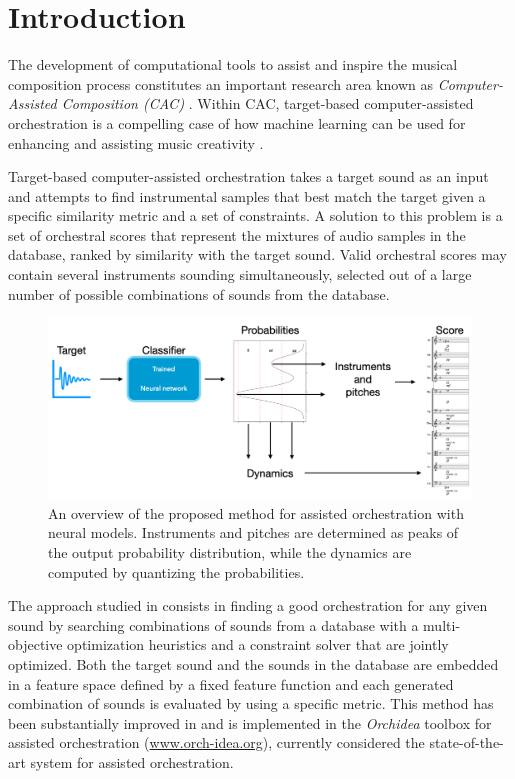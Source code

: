 \documentclass[runningheads,a4paper]{llncs}
\begin{document}
%
\section{Introduction}\label{sec:introduction}

The development of computational tools to assist and inspire the musical composition process constitutes an important research area known as \emph{Computer-Assisted Composition (CAC)} \cite{FerVic2013, Ari2005}. Within CAC, target-based computer-assisted orchestration is a compelling case of how machine learning can be used for {enhancing} and {assisting} music creativity \cite{Maresz2003}. 

Target-based computer-assisted orchestration takes a target sound as an input and attempts to find instrumental samples that best match the target given a specific similarity metric and a set of constraints. A solution to this problem is a set of orchestral scores that represent the mixtures of audio samples in the database, ranked by similarity with the target sound. Valid orchestral scores may contain several instruments sounding simultaneously, selected out of a large number of possible combinations of sounds from the database.

\begin{figure}
	\centering
	\includegraphics[scale=0.20]{../ISMIR_2020/figs/method.png}
	\caption{An overview of the proposed method for assisted orchestration with neural models. Instruments and pitches are determined as peaks of the output probability distribution, while the dynamics are computed by quantizing the probabilities. \label{fig:method}}
\end{figure}

The approach studied in \cite{Carpentier2010} consists in finding a good orchestration for any given sound by searching combinations of sounds from a database with a multi-objective optimization heuristics and a constraint solver that are jointly optimized. Both the target sound and the sounds in the database are embedded in a feature space defined by a fixed feature function and each generated combination of sounds is evaluated by using a specific metric. This method has been substantially improved in \cite{Cella18, Cella2020} and is implemented in the \emph{Orchidea} toolbox for assisted orchestration (\url{www.orch-idea.org}), currently considered the state-of-the-art system for assisted orchestration.
\end{document}
